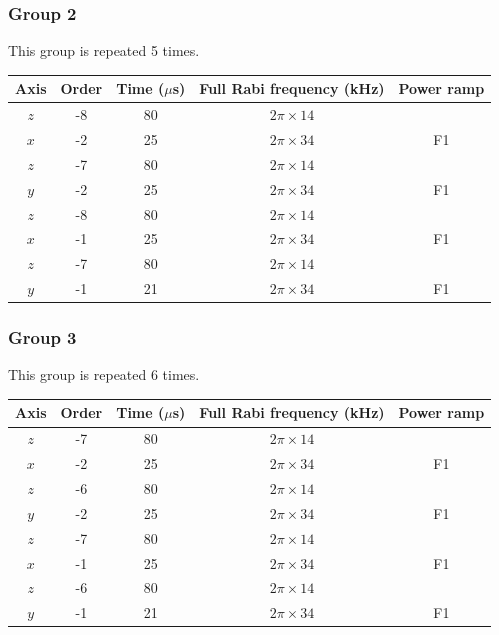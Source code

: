 \documentclass[aps,secnumarabic,amsmath,amssymb]{revtex4}
\begin{document}
\subsubsection{Group 2}
This group is repeated 5 times.
\begin{center}
  \begin{tabular}{|c|c|c|c|c|}
    \hline
    Axis&Order&Time ($\mu$s)&Full Rabi frequency (kHz)&Power ramp\\\hline
    $z$&-8&80&$2\pi\times14$&\\\hline
    $x$&-2&25&$2\pi\times34$&F1\\\hline
    $z$&-7&80&$2\pi\times14$&\\\hline
    $y$&-2&25&$2\pi\times34$&F1\\\hline
    $z$&-8&80&$2\pi\times14$&\\\hline
    $x$&-1&25&$2\pi\times34$&F1\\\hline
    $z$&-7&80&$2\pi\times14$&\\\hline
    $y$&-1&21&$2\pi\times34$&F1\\\hline
  \end{tabular}
\end{center}
\subsubsection{Group 3}
This group is repeated 6 times.
\begin{center}
  \begin{tabular}{|c|c|c|c|c|}
    \hline
    Axis&Order&Time ($\mu$s)&Full Rabi frequency (kHz)&Power ramp\\\hline
    $z$&-7&80&$2\pi\times14$&\\\hline
    $x$&-2&25&$2\pi\times34$&F1\\\hline
    $z$&-6&80&$2\pi\times14$&\\\hline
    $y$&-2&25&$2\pi\times34$&F1\\\hline
    $z$&-7&80&$2\pi\times14$&\\\hline
    $x$&-1&25&$2\pi\times34$&F1\\\hline
    $z$&-6&80&$2\pi\times14$&\\\hline
    $y$&-1&21&$2\pi\times34$&F1\\\hline
  \end{tabular}
\end{center}
\end{document}
